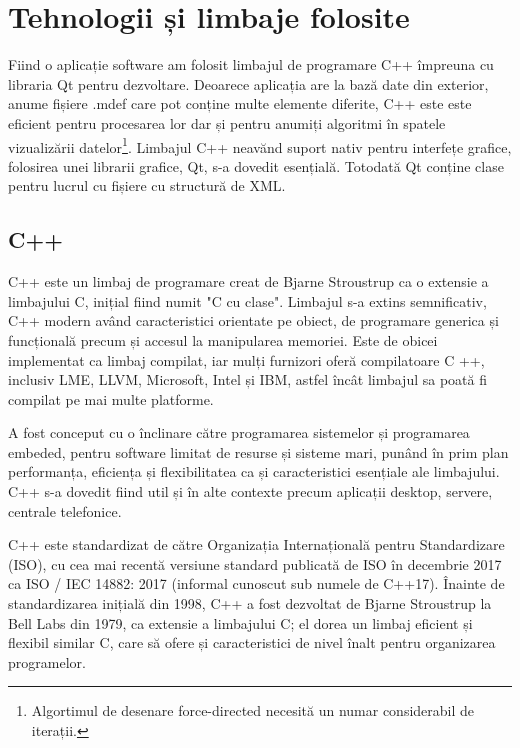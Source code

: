 \newpage
\section{Tehnologii și limbaje folosite}

Fiind o aplicație software am folosit limbajul de programare C++ împreuna cu libraria Qt pentru dezvoltare. Deoarece aplicația are la 
bază date din exterior, anume fișiere .mdef care pot conține multe elemente diferite, C++ este este eficient pentru procesarea lor
dar și pentru anumiți algoritmi în spatele vizualizării datelor\footnote[1]{Algortimul de desenare force-directed necesită un numar considerabil de iterații.}.
Limbajul C++ neavănd suport nativ pentru interfețe grafice, folosirea unei librarii grafice, Qt, s-a dovedit esențială. 
Totodată Qt conține clase pentru lucrul cu fișiere cu structură de XML.

\subsection{C++}

C++ este un limbaj de programare creat de Bjarne Stroustrup ca o extensie a limbajului C, inițial fiind numit "C cu clase". 
Limbajul s-a extins semnificativ, C++ modern având caracteristici orientate pe obiect, de programare generica și funcțională 
precum și accesul la manipularea memoriei. Este de obicei implementat ca limbaj compilat, iar mulți furnizori oferă 
compilatoare C ++, inclusiv LME, LLVM, Microsoft, Intel și IBM, astfel încât limbajul sa poată fi compilat pe mai multe platforme.\newline 

A fost conceput cu o înclinare către programarea sistemelor și programarea embeded, pentru software limitat de resurse și sisteme mari, 
punând în prim plan performanța, eficiența și flexibilitatea ca și caracteristici esențiale ale limbajului. C++ s-a dovedit 
fiind util și în alte contexte precum aplicații desktop, servere, centrale telefonice.\newline

C++ este standardizat de către Organizația Internațională pentru Standardizare (ISO), cu cea mai recentă versiune standard 
publicată de ISO în decembrie 2017 ca ISO / IEC 14882: 2017 (informal cunoscut sub numele de C++17). Înainte de standardizarea 
inițială din 1998, C++ a fost dezvoltat de Bjarne Stroustrup la Bell Labs din 1979, ca extensie a 
limbajului C; el dorea un limbaj eficient și flexibil similar C, care să ofere și caracteristici de nivel înalt pentru organizarea 
programelor.\newline

